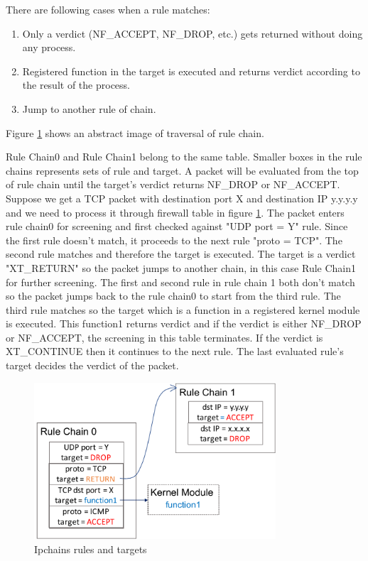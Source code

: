There are following cases when a rule matches: 
\begin{enumerate}
\renewcommand{\labelenumi}{\arabic{enumi})}
	\item Only a verdict (NF\_ACCEPT, NF\_DROP, etc.) gets returned without doing any process.
	\item Registered function in the target is executed and returns verdict according to the result of the process.
	\item Jump to another rule of chain. 
\end{enumerate}

Figure \ref{fig: ip_chains} shows an abstract image of traversal of rule chain. 

Rule Chain0 and Rule Chain1 belong to the same table. Smaller boxes in the rule chains represents sets of rule and target. A packet will be evaluated from the top of rule chain until the target's verdict returns NF\_DROP or NF\_ACCEPT. Suppose we get a TCP packet with destination port X and destination IP y.y.y.y and we need to process it through firewall table in figure \ref{fig: ip_chains}. The packet enters rule chain0 for screening and first checked against "UDP port = Y" rule. Since the first rule doesn't match, it proceeds to the next rule "proto = TCP". The second rule matches and therefore the target is executed. The target is a verdict "XT\_RETURN" so the packet jumps to another chain, in this case Rule Chain1 for further screening. The first and second rule in rule chain 1 both don't match so the packet jumps back to the rule chain0 to start from the third rule. The third rule matches so the target  which is a function in a registered kernel module is executed. This function1 returns verdict and if the verdict is either NF\_DROP or NF\_ACCEPT, the screening in this table terminates. If the verdict is XT\_CONTINUE then it continues to the next rule. The last evaluated rule's target decides the verdict of the packet. 

\begin{figure}
	\centering
	\includegraphics[width=90mm]{pics/ip_chains.pdf}
	\caption{Ipchains rules and targets}
	\label{fig: ip_chains}
\end{figure}

